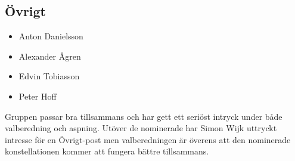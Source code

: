 \subsection{Övrigt}
\begin{autoframe}
\begin{itemize}
\item Anton Danielsson
\item Alexander Ågren
\item Edvin Tobiasson
\item Peter Hoff
\end{itemize}
\bigskip
Gruppen passar bra tillsammans och har gett ett seriöst intryck under både valberedning och aspning.  Utöver de nominerade har Simon Wijk uttryckt intresse för en Övrigt-post men valberedningen är överens att den nominerade konstellationen kommer att fungera bättre tillsammans.
\end{autoframe}